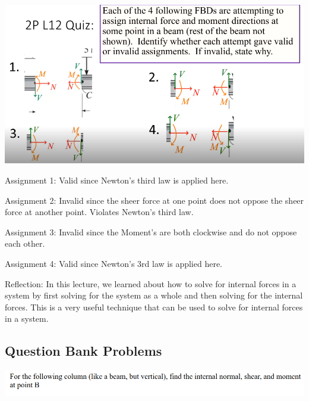 \documentclass{article}[14pt, letterpaper, Times New Roman]
\begin{document}
\includegraphics[width=15cm]{l12-quiz.png}

Assignment 1: Valid since Newton's third law is applied here.

\medskip

Assignment 2: Invalid since the sheer force at one point does not oppose the sheer force at another point.
Violates Newton's third law.

\medskip

Assignment 3: Invalid since the Moment's are both clockwise and do not oppose each other.

\medskip

Assignment 4: Valid since Newton's 3rd law is applied here.

\medskip

Reflection: In this lecture, we learned about how to solve for internal forces in a system by first solving for the system as a whole and then solving for the internal forces. This is a very useful technique that can be used to solve for internal forces in a system.

\subsection{Question Bank Problems}

\includegraphics[width=15cm]{l12-pbq1.png}
\end{document}
